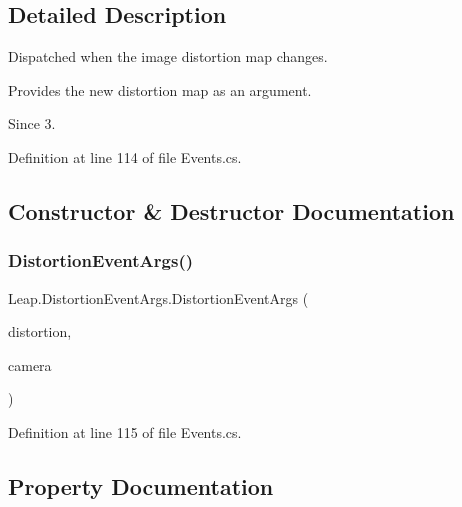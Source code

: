 \subsection{Detailed Description}
Dispatched when the image distortion map changes. 

Provides the new distortion map as an argument. \begin{DoxySince}{Since}
3. 
\end{DoxySince}


Definition at line 114 of file Events.\+cs.



\subsection{Constructor \& Destructor Documentation}
\mbox{\label{class_leap_1_1_distortion_event_args_aa244fd4062a5fc74a992d9d07a6160ac}} 
\subsubsection{\texorpdfstring{DistortionEventArgs()}{DistortionEventArgs()}}
{\footnotesize\ttfamily Leap.\+Distortion\+Event\+Args.\+Distortion\+Event\+Args (\begin{DoxyParamCaption}\item[{\mbox{\hyperlink{class_leap_1_1_distortion_data}{Distortion\+Data}}}]{distortion,  }\item[{\mbox{\hyperlink{class_leap_1_1_image_a28310e43e0f2d7f7117e1b45330bdc38}{Image.\+Camera\+Type}}}]{camera }\end{DoxyParamCaption})}



Definition at line 115 of file Events.\+cs.



\subsection{Property Documentation}
\mbox{\label{class_leap_1_1_distortion_event_args_a99cc48f7f4f195933d9c12241308d0da}} 

